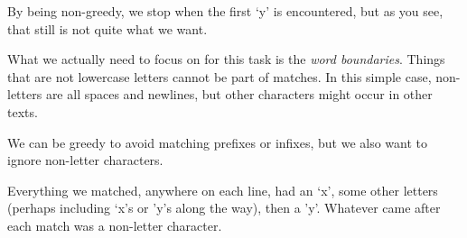 \begin{Shaded}
\begin{Highlighting}[]
\OperatorTok{\textgreater{}\textgreater{}\textgreater{}} 
\end{Highlighting}
\end{Shaded}

By being non-greedy, we stop when the first `y' is encountered, but as
you see, that still is not quite what we want.

What we actually need to focus on for this task is the \emph{word
boundaries}. Things that are not lowercase letters cannot be part of
matches. In this simple case, non-letters are all spaces and newlines,
but other characters might occur in other texts.

We can be greedy to avoid matching prefixes or infixes, but we also want
to ignore non-letter characters.

\begin{Shaded}
\begin{Highlighting}[]
\OperatorTok{\textgreater{}\textgreater{}\textgreater{}}\OperatorTok{=}\NormalTok{(}\NormalTok{)}
\OperatorTok{\textgreater{}\textgreater{}\textgreater{}} 
\end{Highlighting}
\end{Shaded}

Everything we matched, anywhere on each line, had an `x', some other
letters (perhaps including `x's or 'y's along the way), then a 'y'.
Whatever came after each match was a non-letter character.

